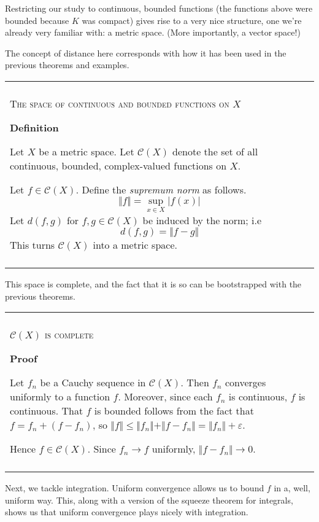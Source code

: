\documentclass{article}
\newenvironment{myboxed}{\bigskip\noindent\begin{tabular}{|p{.975\linewidth}|}\hline \\}{\\\\\hline\end{tabular}\bigskip}
\begin{document}
Restricting our study to continuous, bounded functions (the functions above were bounded because $K$ was compact) gives rise to a very nice structure, one we're already very familiar with: a metric space. (More importantly, a vector space!)

The concept of distance here corresponds with how it has been used in the previous theorems and examples.

\begin{myboxed}
    \textsc{The space of continuous and bounded functions on $X$}

    \textbf{Definition}

    Let $X$ be a metric space. Let $\mathscr{C}(X)$ denote the set of all continuous, bounded, complex-valued functions on $X$.

    Let $f \in \mathscr{C}(X)$. Define the \textit{supremum norm} as follows.
    \[\Vert f \Vert = \sup_{x \in X} |f(x)|\]
    Let $d(f, g)$ for $f, g \in \mathscr{C}(X)$ be induced by the norm; i.e
    \[d(f, g) = \Vert f - g \Vert\]
    This turns $\mathscr{C}(X)$ into a metric space.
\end{myboxed}

This space is complete, and the fact that it is so can be bootstrapped with the previous theorems.

\begin{myboxed}
    \textsc{$\mathscr{C}(X)$ is complete}

    \textbf{Proof}

    Let $f_n$ be a Cauchy sequence in $\mathscr{C}(X)$. Then $f_n$ converges uniformly to a function $f$. Moreover, since each $f_n$ is continuous, $f$ is continuous. That $f$ is bounded follows from the fact that $f = f_n + (f - f_n)$, so $\Vert f \Vert \leq \Vert f_n \Vert + \Vert f - f_n \Vert = \Vert f_n \Vert + \varepsilon$. 

    Hence $f \in \mathscr{C}(X)$. Since $f_n \rightarrow f$ uniformly, $\Vert f - f_n \Vert \rightarrow 0$.

\end{myboxed}

Next, we tackle integration. Uniform convergence allows us to bound $f$ in a, well, uniform way. This, along with a version of the squeeze theorem for integrals, shows us that uniform convergence plays nicely with integration.
\end{document}
